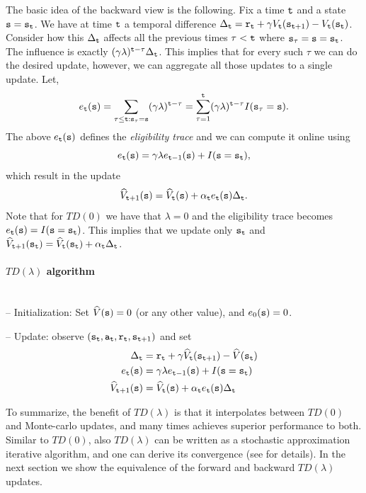 The basic idea of the backward view is the following. Fix a time
${\tt t}$ and a state ${\tt s}={\tt s}_{\tt t}$. We have at time
${\tt t}$ a temporal difference $\Delta_{\tt t}= {\tt r}_{\tt t}
+\gamma V_{\tt t}({\tt s}_{{\tt t}+1})-V_{\tt t}({\tt s}_{\tt t})$.
Consider how this $\Delta_{\tt t}$ affects all the previous times
$\tau<{\tt t}$ where ${\tt s}_\tau={\tt s}={\tt s}_{\tt t}$. The influence is
exactly $(\gamma\lambda)^{{\tt t}-\tau}\Delta_{\tt t}$. This implies
that for every such $\tau$ we can do the desired update, however, we
can aggregate all those updates to a single update. Let,
\[
e_{\tt t}({\tt s})=\sum_{\tau\leq {\tt t}: {\tt s}_\tau={\tt s}}
(\gamma\lambda)^{{\tt t}-\tau} = \sum_{\tau=1}^{\tt t}
(\gamma\lambda)^{{\tt t}-\tau}I({\tt s}_\tau={\tt s}).
\]
The above $e_{\tt t}({\tt s})$ defines the {\em eligibility trace} and
we can compute it online using
\[
e_{\tt t}({\tt s})=\gamma\lambda
e_{{\tt t}-1}({\tt s})+I({\tt s}={\tt s}_{\tt t}),
\]
which result in the update
\[
\widehat{V}_{{\tt t}+1}({\tt s})=\widehat{V}_{\tt t}({\tt s})+\alpha_{\tt t}
e_{\tt t}({\tt s})\Delta_{\tt t}.
\]
Note that for $TD(0)$ we have that $\lambda=0$ and the eligibility
trace becomes $e_{\tt t}({\tt s})=I({\tt s}={\tt s}_{\tt t})$. This
implies that we update only ${\tt s}_{\tt t}$ and
$\widehat{V}_{{\tt t}+1}({\tt s}_{\tt t})=\widehat{V}_{\tt t}({\tt s}_{\tt t})+\alpha_{\tt t}
\Delta_{\tt t}$.

\paragraph{$TD(\lambda)$ algorithm}\ \\

 -- Initialization: Set $\widehat{V}({\tt s})=0$ (or any other value), and
 $e_0({\tt s})=0$.

 -- Update: observe $({\tt s}_{\tt t},{\tt a}_{\tt t},{\tt r}_{\tt t},{\tt s}_{{\tt t}+1})$ and set
\begin{align*}
\Delta_{\tt t} &= {\tt r}_{\tt t} +\gamma \widehat{V}_{\tt t}({\tt s}_{{\tt t}+1})-\widehat{V}({\tt s}_{\tt t})\\
e_{\tt t}({\tt s}) &= \gamma\lambda e_{{\tt t}-1}({\tt s})+I({\tt s}={\tt s}_{\tt t})\\
\widehat{V}_{{\tt t}+1}({\tt s}) &=
\widehat{V}_{\tt t}({\tt s})+\alpha_{\tt t} e_{\tt t}
({\tt s})\Delta_{\tt t}
\end{align*}

 To summarize, the
benefit of $TD(\lambda)$ is that it interpolates between $TD(0)$ and
Monte-carlo updates, and many times achieves superior performance to
both.
%
Similar to $TD(0)$, also  $TD(\lambda)$ can be written as a
stochastic approximation iterative algorithm, and one can derive its convergence (see \cite{JaakkolaJS94} for details).
%
In the next section we show the equivalence of the forward and
backward $TD(\lambda)$ updates.
%

